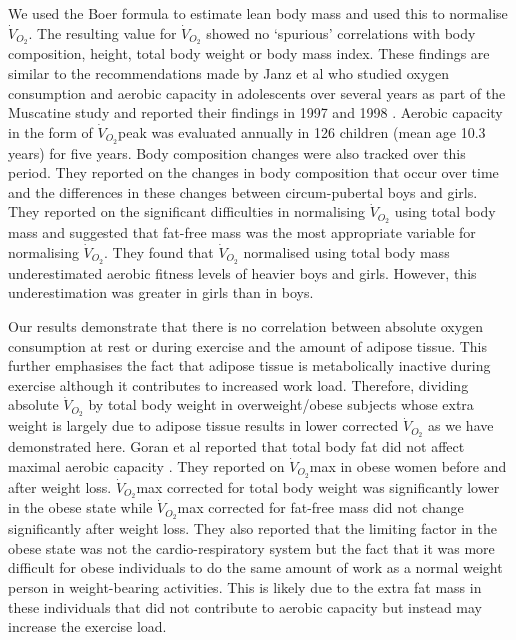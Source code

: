 We used the Boer formula \parencite{boer_estimated_1984}to estimate lean body mass and used this to normalise $\dot{V}_{O_2}$. The resulting value for $\dot{V}_{O_2}$ showed no `spurious' correlations with body composition, height, total body weight or body mass index. These findings are similar to the recommendations made by Janz et al who studied oxygen consumption and aerobic capacity in adolescents over several years as part of the Muscatine study and reported their findings in 1997\parencite{janz_three-year_1997} and 1998 \parencite{janz_longitudinal_1998}. Aerobic capacity in the form of $\dot{V}_{O_2}$peak was evaluated annually in 126 children (mean age 10.3 years) for five years. Body composition changes were also tracked over this period. They reported on the changes in body composition that occur over time and the differences in these changes between circum-pubertal boys and girls. They reported on the significant difficulties in normalising $\dot{V}_{O_2}$ using total body mass and suggested that fat-free mass was the most appropriate variable for normalising $\dot{V}_{O_2}$. They found that $\dot{V}_{O_2}$ normalised using total body mass underestimated aerobic fitness levels of heavier boys and girls. However, this underestimation was greater in girls than in boys. 

Our results demonstrate that there is no correlation between absolute oxygen consumption at rest or during exercise and the amount of adipose tissue. This further emphasises the fact that adipose tissue is metabolically inactive during exercise although it contributes to increased work load. Therefore, dividing absolute $\dot{V}_{O_2}$ by total body weight in overweight/obese subjects whose extra weight is largely due to adipose tissue results in lower corrected $\dot{V}_{O_2}$ as we have demonstrated here. 
Goran et al reported that total body fat did not affect maximal aerobic capacity \parencite{goran_total_2000}. They reported on $\dot{V}_{O_2}$max in obese women before and after weight loss. $\dot{V}_{O_2}$max corrected for total body weight was significantly lower in the obese state while $\dot{V}_{O_2}$max corrected for fat-free mass did not change significantly after weight loss. They also reported that the limiting factor in the obese state was not the cardio-respiratory system but the fact that it was more difficult for obese individuals to do the same amount of work as a normal weight person in weight-bearing activities. This is likely due to the extra fat mass in these individuals that did not contribute to aerobic capacity but instead may increase the exercise load.

